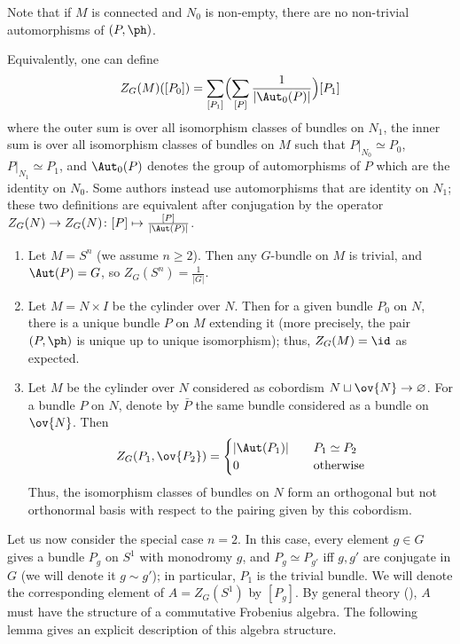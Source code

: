 Note that if $M$ is connected and $N_0$ is non-empty, there are
no non-trivial automorphisms of $(P,\ph)$.

Equivalently, one can define %
$$
  Z_G(M)([P_0]) = \sum_{[P_1]} \Bigl(
                                    \sum_{[P]} \frac{1}{|\Aut_0(P)|}
                                \Bigr) [P_1]
$$
where the outer sum is over all isomorphism classes of bundles on $N_1$, the
inner sum is over all isomorphism classes of bundles on $M$ such that
$P|_{N_0}\simeq P_0$, $P|_{N_1}\simeq P_1$, and $\Aut_0(P)$ denotes the group of
automorphisms of $P$ which are the identity on $N_0$. Some authors instead use
automorphisms that are identity on $N_1$; these two definitions are equivalent
after conjugation by the operator
$Z_G(N)\to Z_G(N)\colon [P]\mapsto \frac{[P]}{|\Aut(P)|}$.

\begin{example}\label{x:dw-invariants}\par\noindent
  \begin{enumerate}
    \item Let $M=S^n$ (we assume $n\ge 2$). Then any $G$-bundle on $M$ is
      trivial, and $\Aut(P)=G$, so $Z_G(S^n)=\frac{1}{|G|}$.
    \item Let $M=N\times I$ be the cylinder over $N$.
      Then for a given bundle $P_0$ on $N$,
      there is a unique bundle $P$ on $M$ extending it (more precisely, the pair
      $(P, \ph)$ is unique up to unique isomorphism); thus, $Z_G(M)=\id$ as
      expected.
    \item Let $M$ be the cylinder over $N$ considered as cobordism $N\sqcup
      \ov{N}\to \varnothing$. For a bundle $P$ on $N$,
      denote by $\bar P$ the same bundle considered as a bundle
      on $\ov{N}$. Then
      $$
      Z_G(P_1, \ov{P_2})=
      \begin{cases}
        |\Aut(P_1)| &\quad P_1\simeq P_2\\
        0 & \quad\text{otherwise}
      \end{cases}
      $$
      Thus, the isomorphism classes of bundles on $N$ form an orthogonal but not
      orthonormal basis with respect to the pairing given by this cobordism.
  \end{enumerate}
\end{example}

Let us now consider the special case $n=2$. In this case, every element $g\in G$
gives a bundle $P_g$ on $S^1$ with monodromy $g$, and $P_g\simeq P_{g'}$ iff $g,
g'$ are conjugate in $G$ (we will denote it $g\sim g'$); in particular, $P_1$ is
the trivial bundle. We will denote the corresponding element of $A=Z_G(S^1)$ by
$[P_g]$. By general theory (), $A$ must have the
structure of a commutative Frobenius algebra. The following lemma gives an
explicit description of this algebra structure.

